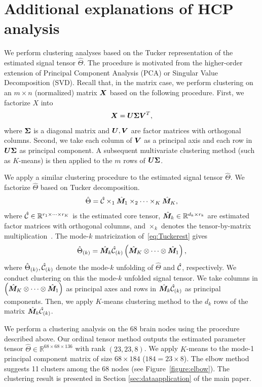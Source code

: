 \documentclass{article}
\theoremstyle{plain}
\theoremstyle{definition}
\begin{document}
\section{Additional explanations of HCP analysis}\label{sec:additionalHCP}
We perform clustering analyses based on the Tucker representation of the estimated signal tensor $\hat\Theta$. The procedure is motivated from the higher-order extension of Principal Component Analysis (PCA) or Singular Value Decomposition (SVD). Recall that, in the matrix case, we perform clustering on an $m\times n$ (normalized) matrix $\bm X$ based on the following procedure. First, we factorize $X$ into
\begin{equation}
\bm X = \bm{U}\bm \Sigma \bm{V}^T,
\end{equation}
where $\bm \Sigma$ is a diagonal matrix and $\bm{U},\bm{V}$ are factor matrices with orthogonal columns. Second, we take each column of $\bm{V}$ as a principal axis and each row in $\bm{U}\bm \Sigma$ as principal component. A subsequent multivariate clustering method (such as $K$-means) is then applied to the $m$ rows of $\bm{U}\bm \Sigma$.


We apply a similar clustering procedure to the estimated signal tensor $\hat\Theta$. We factorize $\hat \Theta$ based on Tucker decomposition.
\begin{equation}\label{eq:Tuckerest}
\hat \Theta = \hat {\mathcal{C}}\times_1\hat {\bm M}_1\times_2\cdots\times_K\hat {\bm M}_K,
\end{equation}
where $\hat {\mathcal{C}}\in\mathbb{R}^{r_1\times \cdots \times r_K}$ is the estimated core tensor, $\hat {\bm M}_k\in\mathbb{R}^{d_k\times r_k}$ are estimated factor matrices with orthogonal columns, and $\times_k$ denotes the tensor-by-matrix multiplication~\citep{kolda2009tensor}. The mode-$k$ matricization of~\eqref{eq:Tuckerest} gives
\begin{equation}
\hat \Theta_{(k)} = \hat {\bm M}_k\hat {\mathcal{C}}_{(k)}\left(\hat {\bm M}_K\otimes\cdots\otimes\hat {\bm M}_1\right),
\end{equation}
where $\hat \Theta_{(k)} , \hat {\mathcal{C}}_{(k)}$ denote the mode-$k$ unfolding of $\hat \Theta$ and $\hat {\mathcal{C}}$, respectively. We conduct clustering on this  the mode-$k$ unfolded signal tensor. We take columns in $\left(\hat {\bm M}_K\otimes\cdots\otimes\hat {\bm M}_1\right)$ as principal axes and rows in $\hat {\bm M}_k\hat {\mathcal{C}}_{(k)}$ as principal components. Then, we apply $K$-means clustering method to the $d_k$ rows of the matrix $\hat {\bm M}_k\hat {\mathcal{C}}_{(k)}$.

We perform a clustering analysis on the 68 brain nodes using the procedure described above. Our ordinal tensor method outputs the estimated parameter tensor $\hat\Theta\in\mathbb{R}^{68\times 68\times136}$ with rank $(23,23,8)$. We apply $K$-means to the mode-1 principal component matrix of size $68\times 184$ ($184=23\times8$). The elbow method suggests 11 clusters among the 68 nodes (see Figure~\ref{figure:elbow}).
The clustering result is presented in Section \ref{sec:dataapplication} of the main paper. 
\end{document}
